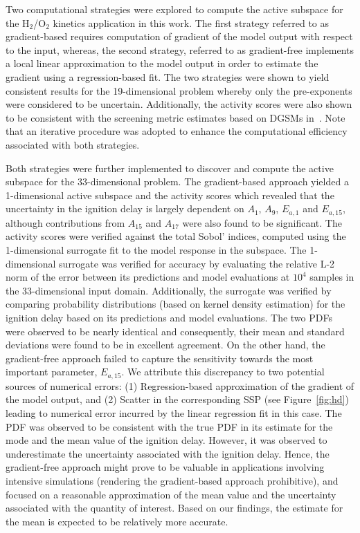 Two computational strategies were explored to compute the active subspace for the H$_2$/O$_2$
kinetics application in this work. The first strategy referred to as gradient-based requires computation of gradient of the 
model output with respect to the input, whereas, the second strategy, referred to as gradient-free implements a local
linear approximation to the model output in order to estimate the gradient using a regression-based fit.
The two strategies were shown to yield
consistent results for the 19-dimensional problem whereby only the pre-exponents were considered to be uncertain.
Additionally, the activity scores were also shown to be consistent with the screening metric estimates based on
DGSMs in~\cite{Vohra:2018}. Note that an iterative procedure was adopted to enhance the computational efficiency
associated with both strategies. 

Both strategies were further implemented to discover and compute the active
subspace for the 33-dimensional problem. The gradient-based approach yielded a 1-dimensional active subspace
and the activity scores which revealed that the uncertainty in the ignition delay is largely dependent on $A_1$, $A_9$, 
$E_{a,1}$ and $E_{a,15}$, although contributions from $A_{15}$ and $A_{17}$ were also found to be significant. The activity
scores were verified against the total Sobol' indices, computed using the 1-dimensional surrogate fit to the model response in
the subspace. The 1-dimensional surrogate was verified for accuracy by evaluating the relative L-2
norm of the error between its predictions and model evaluations at $10^4$ samples in the 33-dimensional input domain.
Additionally, the surrogate was verified by comparing probability distributions (based on kernel density estimation) for
the ignition delay based on its predictions and model evaluations. The two PDFs were observed to be nearly identical
and consequently, their mean and standard deviations were found to be in excellent agreement. On the other hand,
the gradient-free approach failed to capture the sensitivity towards the most important parameter, $E_{a,15}$. 
We attribute this discrepancy to two potential sources of numerical errors: (1) Regression-based approximation of the
gradient of the model output, and (2) Scatter in the corresponding SSP (see Figure~\ref{fig:hd}) leading to numerical
error incurred by the linear regression fit in this case. The PDF was observed to be consistent with the true PDF in its
estimate for the mode and the mean value of the ignition delay. However, it was observed to underestimate the uncertainty 
associated with the ignition delay. Hence, the gradient-free approach might prove to be valuable in applications 
involving intensive simulations (rendering the gradient-based approach prohibitive), and focused on a reasonable 
approximation of the mean value and the uncertainty associated with the quantity of interest. Based on our findings, the 
estimate for the mean is expected to be relatively more accurate. 
 
